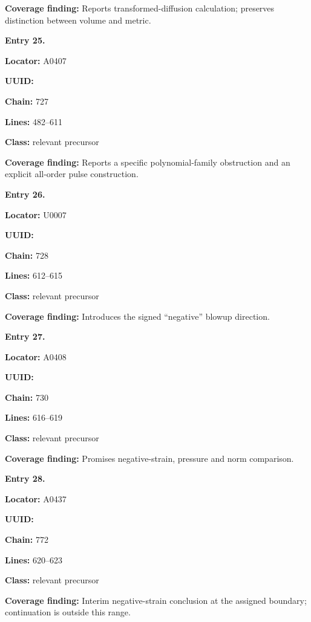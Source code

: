 \documentclass[10pt,a4paper,oneside]{report}
\begin{document}
\textbf{Coverage finding:} Reports transformed-diffusion calculation;
preserves distinction between volume and metric.


\textbf{Entry 25.}

\textbf{Locator:} A0407

\textbf{UUID:} \protect{}

\textbf{Chain:} 727

\textbf{Lines:} 482--611

\textbf{Class:} relevant precursor

\textbf{Coverage finding:} Reports a specific polynomial-family
obstruction and an explicit all-order pulse construction.


\textbf{Entry 26.}

\textbf{Locator:} U0007

\textbf{UUID:} \protect{}

\textbf{Chain:} 728

\textbf{Lines:} 612--615

\textbf{Class:} relevant precursor

\textbf{Coverage finding:} Introduces the signed ``negative'' blowup
direction.


\textbf{Entry 27.}

\textbf{Locator:} A0408

\textbf{UUID:} \protect{}

\textbf{Chain:} 730

\textbf{Lines:} 616--619

\textbf{Class:} relevant precursor

\textbf{Coverage finding:} Promises negative-strain, pressure and norm
comparison.


\textbf{Entry 28.}

\textbf{Locator:} A0437

\textbf{UUID:} \protect{}

\textbf{Chain:} 772

\textbf{Lines:} 620--623

\textbf{Class:} relevant precursor

\textbf{Coverage finding:} Interim negative-strain conclusion at the
assigned boundary; continuation is outside this range.
\end{document}
